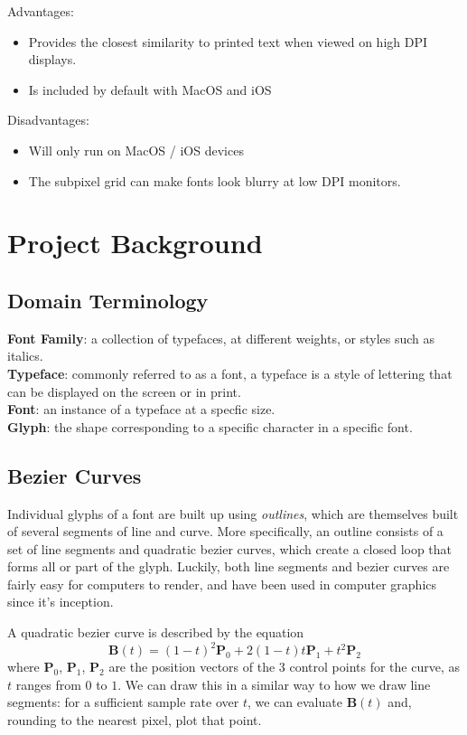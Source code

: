 \documentclass{report}
\begin{document}
Advantages:
\begin{itemize}
  \item{Provides the closest similarity to printed text when viewed on high DPI
      displays. }
  \item{Is included by default with MacOS and iOS}
\end{itemize}

Disadvantages:
\begin{itemize}
\item{Will only run on MacOS / iOS devices}
\item{The subpixel grid can make fonts look blurry at low DPI monitors.}
\end{itemize}
\newpage
\section{Project Background}

\subsection{Domain Terminology}
\textbf{Font Family}: a collection of typefaces, at different weights, or styles
such as italics.
\\
\textbf{Typeface}: commonly referred to as a font, a typeface is a style of
lettering that can be displayed on the screen or in print.
\\
\textbf{Font}: an instance of a typeface at a specfic size.
\\
\textbf{Glyph}: the shape corresponding to a specific character in a specific font. 
\subsection{Bezier Curves}
Individual glyphs of a font are built up using \textit{outlines}, which are
themselves built of several segments of line and curve. More specifically, an
outline consists of a set of line segments and quadratic bezier curves, which
create a closed loop that forms all or part of the glyph. Luckily, both line
segments and bezier curves are fairly easy for computers to render, and have
been used in computer graphics since it's inception.

A quadratic bezier curve is described by the equation
\begin{equation*}
\mathbf{B}(t) = (1 - t)^2\mathbf{P}_0 +2(1 - t)t\mathbf{P}_1 + t^2\mathbf{P}_2
\end{equation*}
where $\mathbf{P}_0$, $\mathbf{P}_1$, $\mathbf{P}_2$ are the position vectors of
the 3 control points for the curve, as $t$ ranges from $0$ to $1$. We can draw
this in a similar way to how we draw line segments: for a sufficient sample rate
over $t$, we can evaluate $\mathbf{B}(t)$ and, rounding to the nearest pixel,
plot that point.
\end{document}

